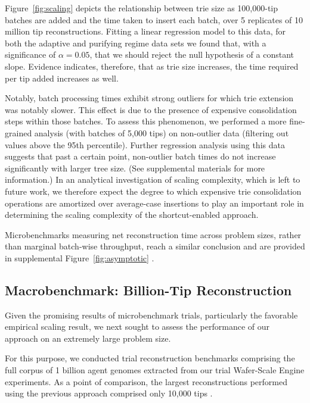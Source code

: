 Figure~\ref{fig:scaling} depicts the relationship between trie size as 100,000-tip batches are added and the time taken to insert each batch, over 5 replicates of 10 million tip reconstructions.
Fitting a linear regression model to this data, for both the adaptive and purifying regime data sets we found that, with a significance of $\alpha = 0.05$, that we should reject the null hypothesis of a constant slope.
Evidence indicates, therefore, that as trie size increases, the time required per tip added increases as well.

Notably, batch processing times exhibit strong outliers for which trie extension was notably slower.
This effect is due to the presence of expensive consolidation steps within those batches.
To assess this phenomenon, we performed a more fine-grained analysis (with batches of 5,000 tips) on non-outlier data (filtering out values above the 95th percentile).
Further regression analysis using this data suggests that past a certain point, non-outlier batch times do not increase significantly with larger tree size.
(See supplemental materials \citep{supplemental} for more information.)
In an analytical investigation of scaling complexity, which is left to future work, we therefore expect the degree to which expensive trie consolidation operations are amortized over average-case insertions to play an important role in determining the scaling complexity of the shortcut-enabled approach.

Microbenchmarks measuring net reconstruction time across problem sizes, rather than marginal batch-wise throughput, reach a similar conclusion and are provided in supplemental Figure~\ref{fig:asymptotic} \citep{supplemental}.

\subsection{Macrobenchmark: Billion-Tip Reconstruction}



Given the promising results of microbenchmark trials, particularly the favorable empirical scaling result, we next sought to assess the performance of our approach on an extremely large problem size.

For this purpose, we conducted trial reconstruction benchmarks comprising the full corpus of 1 billion agent genomes extracted from our trial Wafer-Scale Engine experiments.
As a point of comparison, the largest reconstructions performed using the previous approach comprised only 10,000 tips \citep{moreno2024trackable}.

